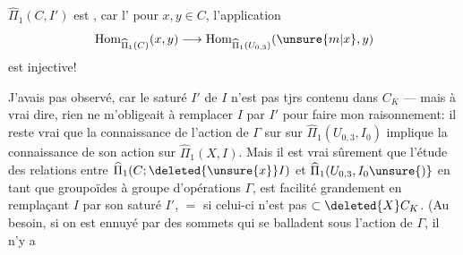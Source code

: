 $\widehat\Pi_1(C,I')$ est  , car l' pour $x,y\in C$, l'application
\[
\operatorname{Hom}_{\widehat\Pi_1(C)}(x,y)\longrightarrow\operatorname{Hom}_{\widehat\Pi_1(U_{0,3})}(\unsure{m|x},y)
\]
est injective!

J'avais pas observé, car le saturé $I'$ de $I$  n'est pas tjrs  contenu dans  $C_K$ --- mais à vrai dire, rien ne m'obligeait à remplacer $I$ par $I'$ pour faire mon raisonnement: il reste vrai que la connaissance de l'action de $\Gamma$ sur sur $\widehat\Pi_1(U_{0,3},I_0)$ implique la connaissance de son action sur $\widehat\Pi_1(X,I)$. Mais il est vrai sûrement que l'étude des relations entre $\widehat\Pi_1(C;\deleted{\unsure{x}}I)$ et $\widehat\Pi_1(U_{0,3},I_0\unsure{)}$ en tant que groupoïdes à groupe d'opérations $\Gamma$, est facilité grandement en remplaçant $I$ par son saturé $I'$, $=$ si celui-ci n'est pas $\subset\deleted{X}C_K$. (Au besoin, si on est ennuyé par des sommets qui se balladent sous l'action de $\Gamma$, il n'y a
